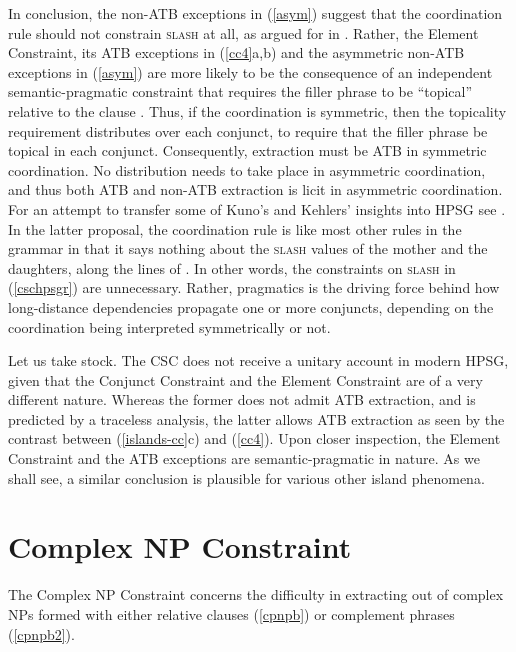 \documentclass[output=paper
 	        ,biblatex
                ,babelshorthands
                ,newtxmath
                ,draftmode
                ,colorlinks, citecolor=brown
]{langscibook}
\begin{document}
In conclusion, the non-ATB exceptions in (\ref{asym}) suggest that the coordination rule should not
constrain \textsc{slash} at all, as argued for in \citet{chaves}.  Rather, the Element Constraint, its
ATB exceptions in (\ref{cc4}a,b) and the asymmetric non-ATB exceptions in (\ref{asym}) are more
likely to be the consequence of an independent semantic-pragmatic constraint that requires the
filler phrase to be ``topical'' relative to the clause
\citep{lakoff86,kuno87,kehler,kubotalee}. Thus, if the coordination is symmetric, then the
topicality requirement distributes over each conjunct, to require that the filler phrase be topical
in each conjunct. Consequently, extraction must be ATB in symmetric coordination. No distribution
needs to take place in asymmetric coordination, and thus both ATB and non-ATB extraction is licit in
asymmetric coordination. For an attempt to transfer some of Kuno's and Kehlers' insights into HPSG
see \citet{chaves}. In the latter proposal, the coordination rule is like most other rules in the
grammar in that it says nothing about the \textsc{slash} values of the mother and the daughters, along
the lines of \citet[354]{levhubook}. In other words, the constraints on \textsc{slash} in
(\ref{cschpsgr}) are unnecessary.  Rather, pragmatics is the driving force behind how long-distance
dependencies propagate one or more conjuncts, depending on the coordination being interpreted
symmetrically or not.  



Let us take stock. The CSC does not receive a unitary account in modern HPSG, given that the
Conjunct Constraint and the Element Constraint are of a very different nature. Whereas the former
does not admit ATB extraction, and is predicted by a traceless analysis, the latter allows ATB
extraction as seen by the contrast between (\ref{islands-cc}c) and (\ref{cc4}).  Upon closer
inspection, the Element Constraint and the ATB exceptions are semantic-pragmatic in nature.  As we
shall see, a similar conclusion is plausible for various other island phenomena.


\section{Complex NP Constraint}

The Complex NP Constraint concerns the difficulty in extracting out of complex NPs formed with
either relative clauses (\ref{cpnpb}) or complement phrases (\ref{cpnpb2}).
\end{document}
